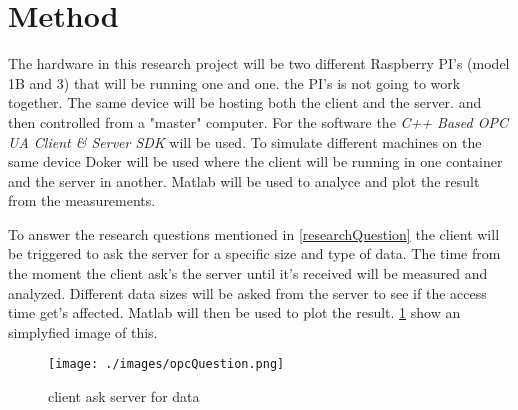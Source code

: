 \section{Method}
The hardware in this research project will be two different Raspberry PI's (model 1B and 3) that will be running one and one. the PI's is not going to work together. The same device will be hosting both the client and the server. and then controlled from a "master" computer.
For the software the \textit{C++ Based OPC UA Client \& Server SDK} \cite{opcSdk} will be used. To simulate different machines on the same device Doker \cite{docker} will be used where the client will be running in one container and the server in another.
Matlab will be used to analyce and plot the result from the measurements.

\bigskip

To answer the research questions mentioned in \cref{researchQuestion} the client will be triggered to ask the server for a specific size and type of data. The time from the moment the client ask's the server until it's received will be measured and analyzed. 
Different data sizes will be asked from the server to see if the access time get's affected. Matlab will then be used to plot the result. \cref{opcFlow} show an simplyfied image of this.


\begin{figure}[h]
    \centering
    \texttt{[image: ./images/opcQuestion.png]}
    \caption{client ask server for data} \label{opcFlow}
\end{figure}

